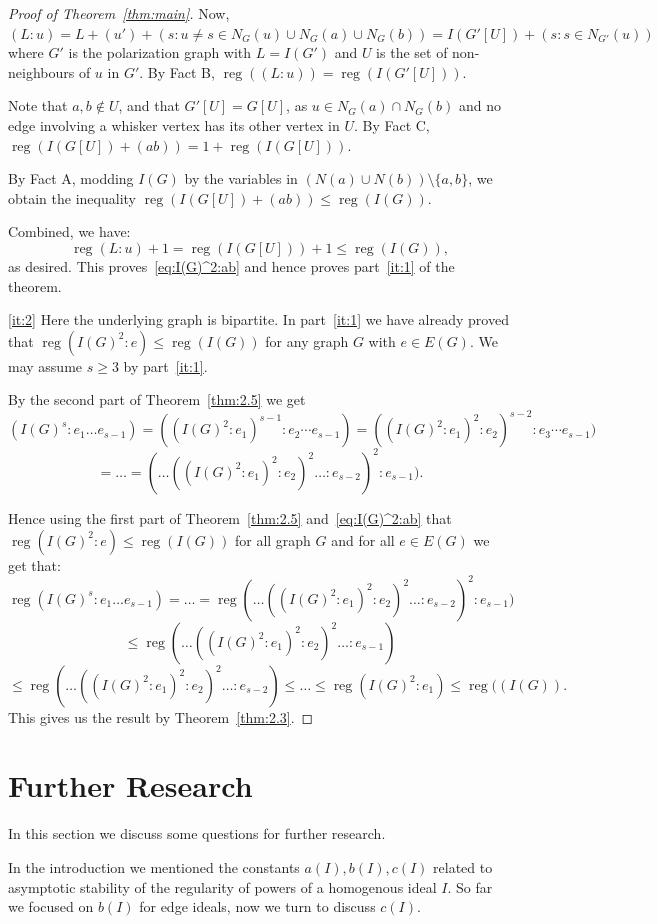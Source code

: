 \documentclass[ALCO,published]{cedram}
\numberwithin{equation}{section}
\newcommand \reg{\operatorname{reg}}
\begin{document}
\begin{proof}[Proof of Theorem~\ref{thm:main}]
Now, $(L:u)=L+(u')+(s: u\neq s\in N_G(u)\cup N_G(a)\cup N_G(b))=I(G'[U])+(s: s\in N_{G'}(u))$ where $G'$ is the polarization graph with $L=I(G')$ and $U$ is the set of non-neighbours of $u$ in $G'$.
By Fact B, $\reg((L:u))=\reg(I(G'[U]))$.

Note that  $a,b\notin
U$, and that $G'[U]=G[U]$, as $u\in N_G(a)\cap N_G(b)$ and no edge involving a whisker vertex has its other vertex in $U$.
By Fact C,
$\reg(I(G[U])+(ab))=1+\reg(I(G[U]))$.

By Fact A, modding $I(G)$ by the variables in $(N(a)\cup N(b))\setminus \{a,b\}$, we obtain the inequality $\reg(I(G[U])+(ab))\leq \reg(I(G))$.
    
Combined, we have: $$\reg(L:u)+1=\reg(I(G[U]))+1\leq \reg(I(G)), $$
as desired. 
This proves~\eqref{eq:I(G)^2:ab} and hence proves part~\ref{it:1} of the theorem.

\ref{it:2} Here the underlying graph is bipartite. In part~\ref{it:1} we have already proved that $\reg(I(G)^2:e)\leq \reg(I(G))$ for any graph $G$ with $e \in E(G)$. We may assume $s \geq 3$ by part~\ref{it:1}.


By the second part of Theorem~\ref{thm:2.5} we get
$$ (I(G)^s:e_1\ldots e_{s-1}) =  ((I(G)^2:e_1)^{s-1}: e_2 \cdots e_{s-1})=  ((I(G)^2:e_1)^2 : e_2)^{s-2}: e_3 \cdots e_{s-1})$$
$$ = \ldots  =(\ldots((I(G)^2:e_1)^2 : e_2)^2 \ldots : e_{s-2})^2 : e_{s-1}).$$

Hence using the first part of Theorem~\ref{thm:2.5} and~\eqref{eq:I(G)^2:ab} that $\reg(I(G)^2:e)\leq \reg(I(G))$ for all graph $G$ and for all $e \in E(G)$ we get that:
$$ \reg(I(G)^s:e_1\ldots e_{s-1}) =
\ldots =
\reg (\ldots((I(G)^2:e_1)^2 : e_2)^2 \ldots : e_{s-2})^2 : e_{s-1})$$
$$\leq \reg  (\ldots((I(G)^2:e_1)^2 : e_2)^2 \ldots : e_{s-1})$$
$$\leq \reg  (\ldots((I(G)^2:e_1)^2 : e_2)^2 \ldots : e_{s-2})\leq \ldots \leq \reg (I(G)^2:e_1)\leq \reg((I(G)).$$
This gives us the result by Theorem~\ref{thm:2.3}.
\end{proof}

\section{Further Research}\label{sec:further}
 In this section we discuss some questions for further research.
 
In the introduction we mentioned the constants $a(I), b(I), c(I)$ related to
asymptotic stability of the regularity of powers of a homogenous ideal $I$. So far we focused on $b(I)$ for edge ideals, now we turn to discuss $c(I)$.
\end{document}
